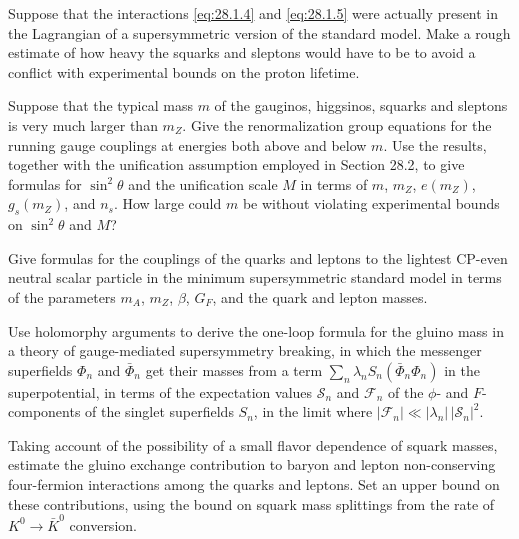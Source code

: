
\begin{enumerate}
   Suppose that the interactions \eqref{eq:28.1.4} and
  \eqref{eq:28.1.5} were actually present in the Lagrangian of a
  supersymmetric version of the standard model. Make a rough estimate
  of how heavy the squarks and sleptons would have to be to avoid a
  conflict with experimental bounds on the proton lifetime.

   Suppose that the typical mass $m$ of the gauginos, higgsinos,
  squarks and sleptons is very much larger than $m_Z$. Give the
  renormalization group equations for the running gauge couplings at
  energies both above and below $m$. Use the results, together with the
  unification assumption employed in Section 28.2, to give formulas for
  $\sin^2\theta$ and the unification scale $M$ in terms of $m$, $m_Z$,
  $e(m_Z)$, $g_s(m_Z)$, and $n_s$. How large could $m$ be without
  violating experimental bounds on $\sin^2\theta$ and $M$?

   Give formulas for the couplings of the quarks and leptons to
  the lightest CP-even neutral scalar particle in the minimum
  supersymmetric standard model in terms of the parameters $m_A$,
  $m_Z$, $\beta$, $G_F$, and the quark and lepton masses.

   Use holomorphy arguments to derive the one-loop formula for the
  gluino mass in a theory of gauge-mediated supersymmetry breaking, in
  which the messenger superfields $\Phi_n$ and $\bar\Phi_n$ get their
  masses from a term
  $\sum_n\lambda_nS_n(\bar\Phi_n\Phi_n)$ in the superpotential, in terms
  of the expectation values $\mathcal{S}_n$ and $\mathcal{F}_n$ of the
  $\phi$- and $F$-components of the singlet superfields $S_n$, in the
  limit where
  $|\mathcal{F}_n|\ll|\lambda_n|\,|\mathcal{S}_n|^2$.

   Taking account of the possibility of a small flavor dependence
  of squark masses, estimate the gluino exchange contribution to baryon
  and lepton non-conserving four-fermion interactions among the quarks
  and leptons. Set an upper bound on these contributions, using the
  bound on squark mass splittings from the rate of
  $K^0\longrightarrow\bar K^0$ conversion.
\end{enumerate}
